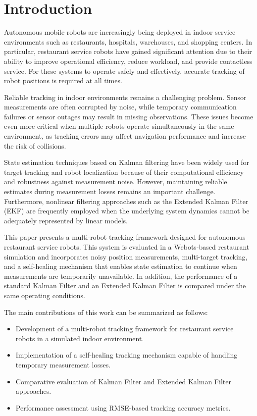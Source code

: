 \documentclass[conference]{IEEEtran}
\begin{document}
\section{Introduction}

Autonomous mobile robots are increasingly being deployed in indoor service environments such as restaurants, hospitals, warehouses, and shopping centers. In particular, restaurant service robots have gained significant attention due to their ability to improve operational efficiency, reduce workload, and provide contactless service. For these systems to operate safely and effectively, accurate tracking of robot positions is required at all times.

Reliable tracking in indoor environments remains a challenging problem. Sensor measurements are often corrupted by noise, while temporary communication failures or sensor outages may result in missing observations. These issues become even more critical when multiple robots operate simultaneously in the same environment, as tracking errors may affect navigation performance and increase the risk of collisions.

State estimation techniques based on Kalman filtering have been widely used for target tracking and robot localization because of their computational efficiency and robustness against measurement noise. However, maintaining reliable estimates during measurement losses remains an important challenge. Furthermore, nonlinear filtering approaches such as the Extended Kalman Filter (EKF) are frequently employed when the underlying system dynamics cannot be adequately represented by linear models.

This paper presents a multi-robot tracking framework designed for autonomous restaurant service robots. This system is evaluated in a Webots-based restaurant simulation and incorporates noisy position measurements, multi-target tracking, and a self-healing mechanism that enables state estimation to continue when measurements are temporarily unavailable. In addition, the performance of a standard Kalman Filter and an Extended Kalman Filter is compared under the same operating conditions.

The main contributions of this work can be summarized as follows:
\begin{itemize}
\item Development of a multi-robot tracking framework for restaurant service robots in a simulated indoor environment.
\item Implementation of a self-healing tracking mechanism capable of handling temporary measurement losses.
\item Comparative evaluation of Kalman Filter and Extended Kalman Filter approaches.
\item Performance assessment using RMSE-based tracking accuracy metrics.
\end{itemize}
\end{document}
